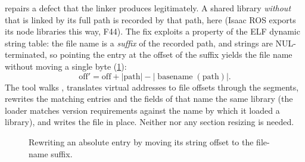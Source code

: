 \documentclass[11pt,a4paper]{article}
\newcommand{\codeb}[1]{\texttt{\detokenize{#1}}}      %
\newcommand{\finding}[1]{\textsf{\small F#1}}
\begin{document}
 repairs a defect that the linker produces legitimately. A shared library \emph{without}
 that is linked by its full path is recorded by that path, here
 (Isaac ROS exports its node libraries this way,
\finding{44}). The fix exploits a property of the ELF dynamic string table: the file name is a \emph{suffix} of the
recorded path, and strings are NUL-terminated, so pointing the  entry at the offset of the suffix
yields the file name without moving a single byte (\cref{fig:dynstr}):
\begin{equation}
  \mathrm{off}' = \mathrm{off} + \lvert\mathrm{path}\rvert - \lvert\operatorname{basename}(\mathrm{path})\rvert .
\end{equation}
The tool walks , translates virtual addresses to file offsets through the  segments,
rewrites the matching  entries and the  fields of  that name the
same library (the loader matches version requirements against the name by which it loaded a library), and writes the
file in place. Neither  nor any section resizing is needed.

\begin{figure}[H]
\centering
{}
\caption{Rewriting an absolute \codeb{DT_NEEDED} entry by moving its string offset to the file-name suffix.}\label{fig:dynstr}
\end{figure}
\end{document}
